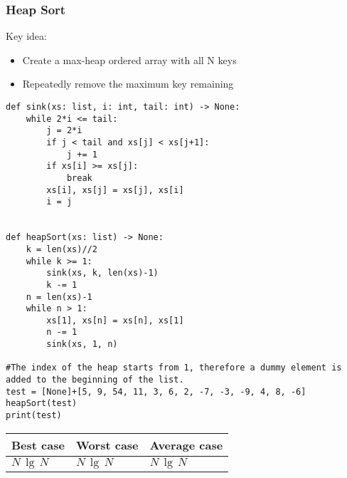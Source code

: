 \documentclass[a4paper]{article}
\begin{document}
\subsubsection*{Heap Sort}
Key idea:
\begin{itemize}
    \item Create a max-heap ordered array with all N keys
    \item Repeatedly remove the maximum key remaining
\end{itemize}
\begin{lstlisting}
def sink(xs: list, i: int, tail: int) -> None:
    while 2*i <= tail:
        j = 2*i
        if j < tail and xs[j] < xs[j+1]:
            j += 1
        if xs[i] >= xs[j]:
            break
        xs[i], xs[j] = xs[j], xs[i]
        i = j


def heapSort(xs: list) -> None:
    k = len(xs)//2
    while k >= 1:
        sink(xs, k, len(xs)-1)
        k -= 1
    n = len(xs)-1
    while n > 1:
        xs[1], xs[n] = xs[n], xs[1]
        n -= 1
        sink(xs, 1, n)

#The index of the heap starts from 1, therefore a dummy element is added to the beginning of the list.
test = [None]+[5, 9, 54, 11, 3, 6, 2, -7, -3, -9, 4, 8, -6]
heapSort(test)
print(test)
\end{lstlisting}
\begin{spacing}{1.5}
\begin{tabularx}{1\textwidth}{|X|X|X|}
    \hline
    \textbf{Best case} & \textbf{Worst case} & \textbf{Average case}\\
    \hline
    $N\,\lg\,N$&$N\,\lg\,N$&$N\,\lg\,N$\\
    \hline
\end{tabularx}
\end{spacing}
\end{document}
